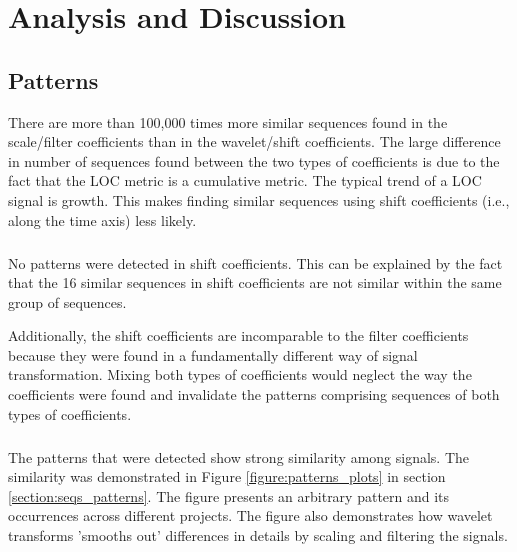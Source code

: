 \chapter{Analysis and Discussion}
\label{analysis}

\section{Patterns}
\label{section:pattern_evaluation}
There are more than 100,000 times more similar sequences found in the
scale/filter coefficients than in the wavelet/shift coefficients. The large
difference in number of sequences found between the two types of coefficients
is due to the fact that the LOC metric is a cumulative metric. The typical
trend of a LOC signal is growth. This makes finding similar sequences using
shift coefficients (i.e., along the time axis) less likely.

\paragraph{}
No patterns were detected in shift coefficients. This can be explained by the
fact that the 16 similar sequences in shift coefficients are not similar within
the same group of sequences.

Additionally, the shift coefficients are incomparable to the filter coefficients
because they were found in a fundamentally different way of signal
transformation. Mixing both types of coefficients would neglect the way the
coefficients were found and invalidate the patterns comprising sequences of
both types of coefficients.

\paragraph{}
The patterns that were detected show strong similarity among signals. The
similarity was demonstrated in Figure \ref{figure:patterns_plots} in section
\ref{section:seqs_patterns}. The figure presents an arbitrary pattern and its
occurrences across different projects. The figure also demonstrates how wavelet
transforms 'smooths out' differences in details by scaling and filtering the
signals.

\begin{comment}
More about:
- A type A pattern and its occurrences
- Compare the pattern occurrence on coefficients to the projection on a signal
- What do the other non-type A patterns tell us?
\end{comment}

